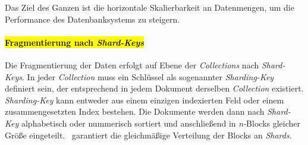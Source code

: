 Das Ziel des Ganzen ist die horizontale Skalierbarkeit an Datenmengen, um die Performance des Datenbanksystems zu steigern.

\paragraph{\colorbox{yellow}{Fragmentierung nach \textit{Shard-Keys}}}\label{sharding-keys}
Die Fragmentierung der Daten erfolgt auf Ebene der \textit{Collections} nach \textit{Shard-Keys}. In jeder \textit{Collection}  muss ein Schlüssel als sogenannter \textit{Sharding-Key} definiert sein, der entsprechend in jedem Dokument derselben \textit{Collection} existiert.  \textit{Sharding-Key} kann entweder aus einem einzigen indexierten Feld oder einem zusammengesetzten Index bestehen. Die Dokumente werden dann nach \textit{Shard-Key} alphabetisch oder nummerisch sortiert und anschließend in \textit{n-}Blocks gleicher Größe eingeteilt. \mongo\ garantiert die gleichmäßige Verteilung der Blocks an \textit{Shards}.
